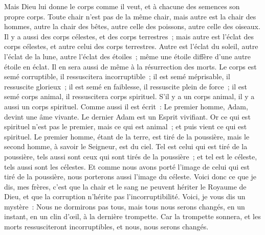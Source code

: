 \begin{multicols}{2}
Mais Dieu lui donne le corps comme il veut, et à chacune des semences son propre corps.
Toute chair n'est pas de la même chair, mais autre est la chair des hommes, autre la chair des bêtes, autre celle des poissons, autre celle des oiseaux.
Il y a aussi des corps célestes, et des corps terrestres~; mais autre est l'éclat des corps célestes, et autre celui des corps terrestres.
Autre est l'éclat du soleil, autre l'éclat de la lune, autre l'éclat des étoiles~; même une étoile diffère d'une autre étoile en éclat.
Il en sera aussi de même à la résurrection des morts. Le corps est semé corruptible, il ressuscitera incorruptible~;
il est semé méprisable, il ressuscite glorieux~; il est semé en faiblesse, il ressuscite plein de force~;
il est semé corps animal, il ressuscitera corps spirituel. S'il y a un corps animal, il y a aussi un corps spirituel.
Comme aussi il est écrit~: Le premier homme, Adam, devint une âme vivante. Le dernier Adam est un Esprit vivifiant.
Or ce qui est spirituel n'est pas le premier, mais ce qui est animal~; et puis vient ce qui est spirituel.
Le premier homme, étant de la terre, est tiré de la poussière, mais le second homme, à savoir le Seigneur, est du ciel.
Tel est celui qui est tiré de la poussière, tels aussi sont ceux qui sont tirés de la poussière~; et tel est le céleste, tels aussi sont les célestes.
Et comme nous avons porté l'image de celui qui est tiré de la poussière, nous porterons aussi l'image du céleste.
Voici donc ce que je dis, mes frères, c'est que la chair et le sang ne peuvent hériter le Royaume de Dieu, et que la corruption n'hérite pas l'incorruptibilité.
Voici, je vous dis un mystère~: Nous ne dormirons pas tous, mais tous nous serons changés,
en un instant, en un clin d'œil, à la dernière trompette. Car la trompette sonnera, et les morts ressusciteront incorruptibles, et nous, nous serons changés.

\end{multicols}
